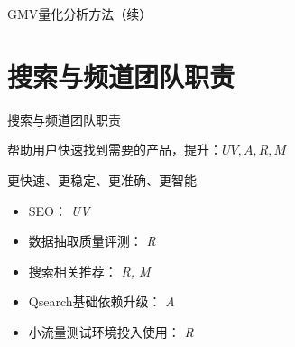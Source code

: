 \documentclass{beamer}
\begin{document}
\begin{CJK}{UTF8}{gbsn}
\begin{frame}{GMV量化分析方法（续）}
\end{frame}

\section{搜索与频道团队职责}

\begin{frame}{搜索与频道团队职责}

帮助用户快速找到需要的产品，提升：$ UV, A, R, M $

更快速、更稳定、更准确、更智能

 {
  \begin{itemize}
    \item SEO： {\itshape UV}
    \item 数据抽取质量评测： {\itshape R}
    \item 搜索相关推荐： {\itshape R, M}
    \item Qsearch基础依赖升级： {\itshape A}
    \item 小流量测试环境投入使用： {\itshape R}
  \end{itemize}
}

\end{frame}





\end{CJK}
\end{document}
